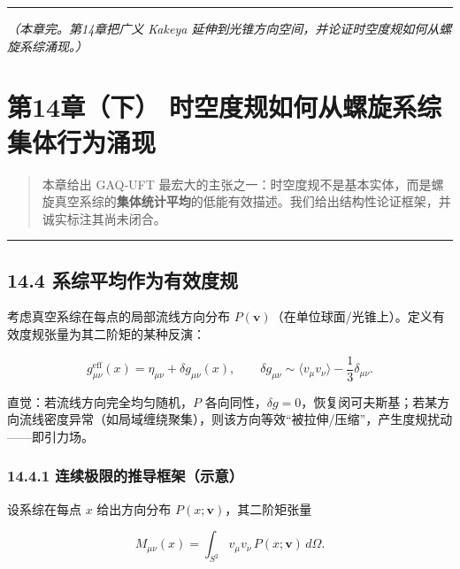 \begin{center}\rule{0.5\linewidth}{0.5pt}\end{center}

\emph{（本章完。第14章把广义 Kakeya
延伸到光锥方向空间，并论证时空度规如何从螺旋系综涌现。）}

\section{第14章（下）
时空度规如何从螺旋系综集体行为涌现}\label{ux7b2c14ux7ae0ux4e0b-ux65f6ux7a7aux5ea6ux89c4ux5982ux4f55ux4eceux87baux65cbux7cfbux7efcux96c6ux4f53ux884cux4e3aux6d8cux73b0}

\begin{quote}
本章给出 GAQ‑UFT
最宏大的主张之一：时空度规不是基本实体，而是螺旋真空系综的\textbf{集体统计平均}的低能有效描述。我们给出结构性论证框架，并诚实标注其尚未闭合。
\end{quote}

\begin{center}\rule{0.5\linewidth}{0.5pt}\end{center}

\subsection{14.4
系综平均作为有效度规}\label{ux7cfbux7efcux5e73ux5747ux4f5cux4e3aux6709ux6548ux5ea6ux89c4}

考虑真空系综在每点的局部流线方向分布
\(P(\mathbf{v})\)（在单位球面/光锥上）。定义有效度规张量为其二阶矩的某种反演：

\[
g_{\mu\nu}^{\mathrm{eff}}(x)=\eta_{\mu\nu}+\delta g_{\mu\nu}(x),\qquad
\delta g_{\mu\nu}\sim \langle v_\mu v_\nu\rangle - \frac{1}{3}\delta_{\mu\nu}.
\]

直觉：若流线方向完全均匀随机，\(P\)
各向同性，\(\delta g=0\)，恢复闵可夫斯基；若某方向流线密度异常（如局域缠绕聚集），则该方向等效``被拉伸/压缩''，产生度规扰动------即引力场。

\subsubsection{14.4.1
连续极限的推导框架（示意）}\label{ux8fdeux7eedux6781ux9650ux7684ux63a8ux5bfcux6846ux67b6ux793aux610f}

设系综在每点 \(x\) 给出方向分布 \(P(x;\mathbf{v})\)，其二阶矩张量

\[
M_{\mu\nu}(x)=\int_{S^2} v_\mu v_\nu\,P(x;\mathbf{v})\,d\Omega.
\]

